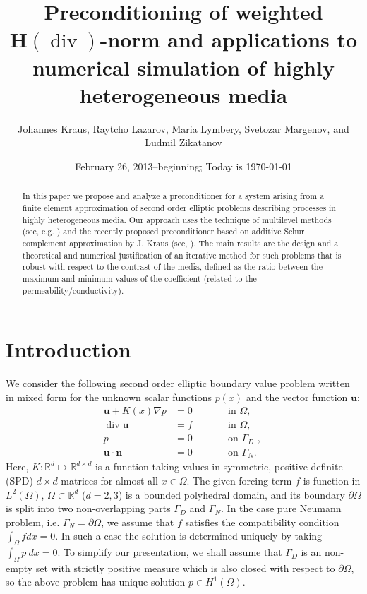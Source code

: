 \documentclass[11pt]{amsart}
\title[Preconditioning of weighted ${{\boldsymbol H}}({\operatorname{div}})$-norm and applications]
{Preconditioning of weighted ${{\boldsymbol H}}({\operatorname{div}})$-norm and applications to numerical simulation of 
highly heterogeneous media}
\author[J.~Kraus, R.~Lazarov, M.~Lymbery, S.~Margenov, L.~Zikatanov]
{Johannes Kraus, Raytcho  Lazarov, Maria Lymbery, Svetozar Margenov, and Ludmil Zikatanov}
\date{February 26, 2013--beginning; Today is \today}
\numberwithin{equation}{section}
\theoremstyle{definition}\newtheorem{example}{Example}[section]
\begin{document}
 
\begin{abstract}
In this paper we propose and analyze  a preconditioner for a system arising from a finite element
approximation of second order elliptic problems describing processes in 
highly heterogeneous media.
Our approach uses the technique of multilevel methods (see,
e.g. \cite{2008VassilevskiP-aa}) and the recently proposed
preconditioner based on additive Schur complement approximation by
J. Kraus (see, \cite{Kraus_12}). The main results are the design and a 
theoretical and numerical justification of an iterative method for
such problems that is robust with respect to the contrast of the
media, defined as the ratio between the maximum and minimum values of
the coefficient (related to the permeability/conductivity).
\end{abstract}
\maketitle

\section{Introduction}\label{sec:intro}
We consider the following second order elliptic 
boundary value problem written in mixed form 
for the unknown scalar functions $p(x)$ 
and the vector function ${{\mathbf u}}$: 
\begin{subequations}
\begin{alignat}{2} 
\label{equation-1}
 {{\mathbf u}} + K(x) \nabla p &= 0 \qquad && \text{in $\Omega$,}\\
\label{equation-2}
{\operatorname{div}} {{\mathbf u}}  &= f && \text{in $\Omega$},\\
\label{D BC}
p &= 0 && \text{on $\Gamma_D$ , } \\%
\label{N BC} 
{{\mathbf u}} \cdot {{\mathbf n}}  &=0 && \text{on $\Gamma_N$. }
\end{alignat}
\end{subequations}
Here, $K: \mathbb{R}^d\mapsto \mathbb{R}^{d\times d}$ is a
function taking values in symmetric, 
positive definite (SPD) $d\times d$ matrices for almost all $x \in \Omega$.
 The given forcing term $f $ is function in $ L^2(\Omega)$,   
 $\Omega \subset \mathbb{R}^d$ ($d=2,3$) is a bounded polyhedral
 domain, and its boundary $\partial \Omega $ is split into two
 non-overlapping parts $\Gamma_D$ and $\Gamma_N$.  In the case pure
 Neumann problem, i.e. $\Gamma_N=\partial \Omega$, we assume that $f$
 satisfies the compatibility condition $\int_\Omega f dx=0$. In such a
 case the solution is determined uniquely by taking $\int_\Omega p ~dx=0$.
 To simplify our presentation, we shall assume that $\Gamma_D$ is an
 non-empty set with strictly positive measure which is also closed
 with respect to $\partial \Omega$, so the above problem
 has unique solution $ p \in H^1(\Omega)$.
\end{document}
